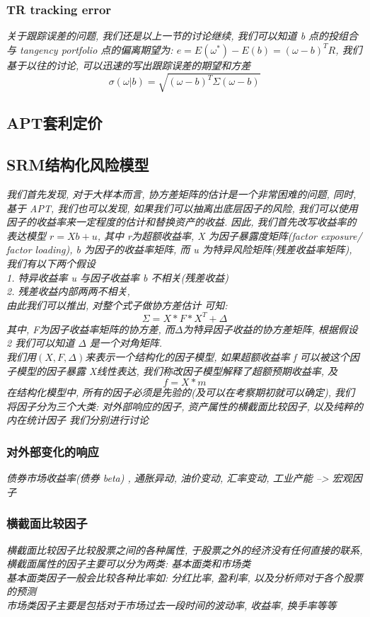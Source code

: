 \documentclass{scrartcl}
\numberwithin{equation}{section}   %
\begin{document}
\subsubsection{TR tracking error}

\textsl{
    关于跟踪误差的问题, 我们还是以上一节的讨论继续, 我们可以知道 b 点的投组合与 tangency portfolio 点的偏离期望为: $e= E(\omega^*) - E(b) = (\omega - b ) ^T R$, 我们基于以往的讨论, 可以迅速的写出跟踪误差的期望和方差$$\sigma(\omega|b) =  \sqrt{(\omega-b )^T \Sigma (\omega- b)}$$
}



\subsection{APT套利定价}


\subsection{SRM结构化风险模型}

\textsl{
    我们首先发现, 对于大样本而言, 协方差矩阵的估计是一个非常困难的问题, 同时, 基于 APT, 我们也可以发现, 如果我们可以抽离出底层因子的风险, 我们可以使用因子的收益率来一定程度的估计和替换资产的收益. 因此, 我们首先改写收益率的表达模型 $ r = X b + u$, 其中 r为超额收益率, X 为因子暴露度矩阵(factor exposure/ factor loading), b 为因子的收益率矩阵, 而 u 为特异风险矩阵(残差收益率矩阵), 我们有以下两个假设\\ 1. 特异收益率 u 与因子收益率 b 不相关(残差收益)\\ 2. 残差收益内部两两不相关,\\ 由此我们可以推出, 对整个式子做协方差估计 可知:$$\Sigma= X* F* X^T + \Delta$$ 其中, F为因子收益率矩阵的协方差, 而$\Delta$为特异因子收益的协方差矩阵, 根据假设 2 我们可以知道 $\Delta$ 是一个对角矩阵.\\ 我们用$(X, F, \Delta)$来表示一个结构化的因子模型, 如果超额收益率 f 可以被这个因子模型的因子暴露 X线性表达, 我们称改因子模型解释了超额预期收益率, 及 $$f = X*m $$ 在结构化模型中, 所有的因子必须是先验的(及可以在考察期初就可以确定), 我们将因子分为三个大类: 对外部响应的因子, 资产属性的横截面比较因子, 以及纯粹的内在统计因子 我们分别进行讨论
}
\subsubsection{对外部变化的响应}
\textsl{
    债券市场收益率(债券 beta) , 通胀异动, 油价变动, 汇率变动, 工业产能  --> 宏观因子
}
\subsubsection{横截面比较因子}
\textsl{横截面比较因子比较股票之间的各种属性, 于股票之外的经济没有任何直接的联系, 横截面属性的因子主要可以分为两类: 基本面类和市场类\\基本面类因子一般会比较各种比率如: 分红比率, 盈利率, 以及分析师对于各个股票的预测 \\市场类因子主要是包括对于市场过去一段时间的波动率, 收益率, 换手率等等}
\end{document}
